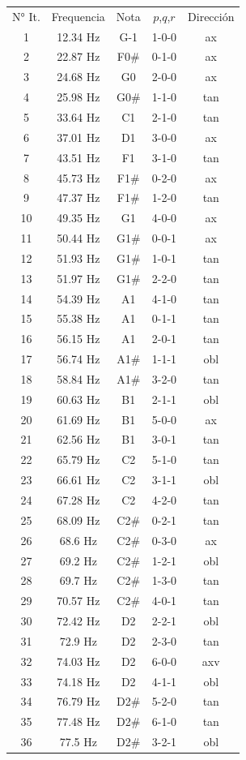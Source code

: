 \begin{table}[]
    \centering
    \begin{tabular}{c|c|c|c|c}
N° It. & Frequencia & Nota & $p$,$q$,$r$ & Dirección \\
1&12.34 Hz&G-1&1-0-0&ax  \\
2&22.87 Hz&F0\#&0-1-0&ax\\
3&24.68 Hz&G0&2-0-0&ax\\
4&25.98 Hz&G0\#&1-1-0&tan\\
5&33.64 Hz&C1&2-1-0&tan\\
6&37.01 Hz&D1&3-0-0&ax\\
7&43.51 Hz&F1&3-1-0&tan\\
8&45.73 Hz&F1\#&0-2-0&ax\\
9&47.37 Hz&F1\#&1-2-0&tan\\
10&49.35 Hz&G1&4-0-0&ax\\
11&50.44 Hz&G1\#&0-0-1&ax\\
12&51.93 Hz&G1\#&1-0-1&tan\\
13&51.97 Hz&G1\#&2-2-0&tan\\
14&54.39 Hz&A1&4-1-0&tan\\
15&55.38 Hz&A1&0-1-1&tan\\
16&56.15 Hz&A1&2-0-1&tan\\
17&56.74 Hz&A1\#&1-1-1&obl\\
18&58.84 Hz&A1\#&3-2-0&tan\\
19&60.63 Hz&B1&2-1-1&obl\\
20&61.69 Hz&B1&5-0-0&ax\\
21&62.56 Hz&B1&3-0-1&tan\\
22&65.79 Hz&C2&5-1-0&tan\\
23&66.61 Hz&C2&3-1-1&obl\\
24&67.28 Hz&C2&4-2-0&tan\\
25&68.09 Hz&C2\#&0-2-1&tan\\
26&68.6 Hz&C2\#&0-3-0&ax\\
27&69.2 Hz&C2\#&1-2-1&obl\\
28&69.7 Hz&C2\#&1-3-0&tan\\
29&70.57 Hz&C2\#&4-0-1&tan\\
30&72.42 Hz&D2&2-2-1&obl\\
31&72.9 Hz&D2&2-3-0&tan\\
32&74.03 Hz&D2&6-0-0&axv\\
33&74.18 Hz&D2&4-1-1&obl\\
34&76.79 Hz&D2\#&5-2-0&tan\\
35&77.48 Hz&D2\#&6-1-0&tan\\
36&77.5 Hz&D2\#&3-2-1&obl\\

\end{tabular}
\end{table}
